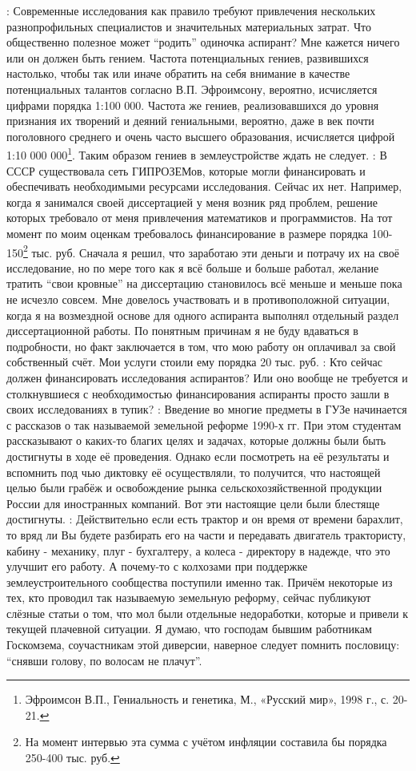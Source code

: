 \begin{drama}
	\maxspeaks: Современные исследования как правило требуют привлечения нескольких разнопрофильных специалистов и значительных материальных затрат. Что общественно полезное может “родить” одиночка аспирант? Мне кажется ничего или он должен быть гением. Частота потенциальных гениев, развившихся настолько, чтобы так или иначе обратить на себя внимание в качестве потенциальных талантов согласно В.П. Эфроимсону, вероятно, исчисляется цифрами порядка 1:100 000. Частота же гениев, реализовавшихся до уровня признания их творений и деяний гениальными, вероятно, даже в век почти поголовного среднего и очень часто высшего образования, исчисляется цифрой 1:10 000 000\footnote{Эфроимсон В.П., Гениальность и генетика, М., «Русский мир», 1998 г., с. 20-21.}. Таким образом гениев в землеустройстве ждать не следует. 
	\maxspeaks: В СССР существовала сеть ГИПРОЗЕМов, которые могли финансировать и обеспечивать необходимыми ресурсами исследования. Сейчас их нет. Например, когда я занимался своей диссертацией у меня возник ряд проблем, решение которых требовало от меня привлечения математиков и программистов. На тот момент по моим оценкам требовалось финансирование в размере порядка 100-150\footnote{На момент интервью эта сумма с учётом инфляции составила бы порядка 250-400 тыс. руб.} тыс. руб. Сначала я решил, что заработаю эти деньги и потрачу их на своё исследование, но по мере того как я всё больше и больше работал, желание тратить “свои кровные” на диссертацию становилось всё меньше и меньше пока не исчезло совсем. Мне довелось участвовать и в противоположной ситуации, когда я на возмездной основе для одного аспиранта выполнял отдельный раздел диссертационной работы. По понятным причинам я не буду вдаваться в подробности, но факт заключается в том, что мою работу он оплачивал за свой собственный счёт. Мои услуги стоили ему порядка 20 тыс. руб. 
	\maxspeaks: Кто сейчас должен финансировать исследования аспирантов? Или оно вообще не требуется и столкнувшиеся с необходимостью финансирования аспиранты просто зашли в своих исследованиях в тупик?
	\maxspeaks: Введение во многие предметы в ГУЗе начинается с рассказов о так называемой земельной реформе 1990-х гг. При этом студентам рассказывают о каких-то благих целях и задачах, которые должны были быть достигнуты в ходе её проведения. Однако если посмотреть на её результаты и вспомнить под чью диктовку её осуществляли, то получится, что настоящей целью были грабёж и освобождение рынка сельскохозяйственной продукции России для иностранных компаний. Вот эти настоящие цели были блестяще достигнуты. 
	\maxspeaks: Действительно если есть трактор и он время от времени барахлит, то вряд ли Вы будете разбирать его на части и передавать двигатель трактористу, кабину - механику, плуг - бухгалтеру, а колеса - директору в надежде, что это улучшит его работу. А почему-то с колхозами при поддержке землеустроительного сообщества поступили именно так. Причём некоторые из тех, кто проводил так называемую земельную реформу, сейчас публикуют слёзные статьи о том, что мол были отдельные недоработки, которые и привели к текущей плачевной ситуации. Я думаю, что господам бывшим работникам Госкомзема, соучастникам этой диверсии, наверное следует помнить пословицу: “снявши голову, по волосам не плачут”.

\end{drama}
